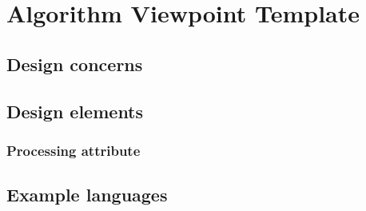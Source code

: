 \chapter{Algorithm Viewpoint Template} \label{chp:algorithm-viewpoint-template}
	\begin{comment}
		The detailed design description of operations (such as methods and functions), the internal details and logic
		of each design entity.
	\end{comment}
	
	\section{Design concerns} \label{s:algorithm-viewpoint-template:design-concerns}
		\begin{comment}
			The Algorithm viewpoint provides details needed by programmers, analysts of algorithms in regard to
			time-space performance and processing logic prior to implementation, and to aid in producing unit test
			plans.
		\end{comment}
	
	\section{Design elements} \label{s:algorithm-viewpoint-template:design-elements}
		\begin{comment}
			These should include the attribute descriptions for identification, processing (5.12.1), and data for all
			design entities.
		\end{comment}
	
		\subsection{Processing attribute} \label{s:algorithm-viewpoint-template:processing-attribute}
			\begin{comment}
				A description of the rules used by the entity to achieve its function. The processing attribute describes the
				algorithm used by the entity to perform a specific task and its contingencies. This description is a
				refinement of the function attribute and is the most detailed level of refinement for the entity.
				
				This description should include timing, sequencing of events or processes, prerequisites for process
				initiation, priority of events, processing level, actual process steps, path conditions, and loop back or loop
				termination criteria. The handling of contingencies should describe the action to be taken in the case of
				overflow conditions or in the case of a validation check failure.
				
				NOTE—This design attribute is retained for compatibility with IEEE Std 1016-1998.
			\end{comment}
			
	\section{Example languages} \label{s:algorithm-viewpoint-template:example-languages}
		\begin{comment}
			Decision tables and flowcharts; program design languages, “pseudo-code,” and (actual) programming
			languages may also be used.
		\end{comment}